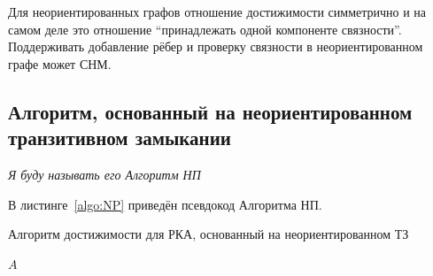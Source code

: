 


Для неориентированных графов отношение достижимости симметрично и на самом деле это отношение ``принадлежать одной компоненте связности''. Поддерживать добавление рёбер и проверку связности в неориентированном графе может СНМ. 

\subsection{Алгоритм, основанный на неориентированном транзитивном замыкании}

\textit{Я буду называть его Алгоритм НП}

В листинге~\ref{algo:NP} приведён псевдокод Алгоритма НП.

\begin{algorithm}[H]
    \begin{algorithmic}[1]
    \caption{Алгоритм достижимости для РКА, основанный на неориентированном ТЗ}
    \label{algo:NP}
            \EndFor
        \EndFor
            \EndIf
        \EndWhile
    \State \Return $A$
    \EndFunction
    \end{algorithmic}
\end{algorithm}

